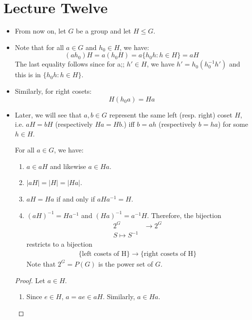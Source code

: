 \section{Lecture Twelve}
\begin{itemize}
    \item From now on, let $G$ be a group and let $H \le G$.
    \item Note that for all $a\in G$ and $h_0 \in H$, we have:
    \begin{equation}
        (ah_0)H=a(h_0H)=a\{h_0h:h \in H\} = aH
    \end{equation}
    The last equality follows since for a;; $h' \in H$, we have $h'=h_0(h_0^{-1}h')$ and this is in $\{h_0h:h\in H\}$.
    \item Similarly, for right cosets:
    \begin{equation}
        H(h_0a)=Ha
    \end{equation}
    \item Later, we will see that $a,b\in G$ represent the same left (resp. right) coset $H$, i.e. $aH=bH$ (respectively $Ha=Hb$.) iff $b=ah$ (respectively $b=ha$) for some $h\in H$.
    \begin{proposition}
        For all $a\in G$, we have:
        \begin{enumerate}
            \item $a\in aH$ and likewise $a\in Ha$.
            \item $|aH|=|H|=|Ha|$.
            \item $aH=Ha$ if and only if $aHa^{-1}=H$.
            \item $(aH)^{-1}=Ha^{-1}$ and $(Ha)^{-1}=a^{-1}H$. Therefore, the bijection
            \begin{align}
                2^G &\rightarrow 2^G \\ 
                S \mapsto S^{-1}
            \end{align}
            restricts to a bijection
            \begin{align}
                \{\text{left cosets of H}\}\rightarrow \{\text{right cosets of H}\}
            \end{align}
            Note that $2^G = P(G)$ is the power set of $G$.
        \end{enumerate}
    \end{proposition}
    \begin{proof}
        Let $a\in H$.
        \begin{enumerate}
            \item Since $e\in H$, $a=ae \in aH$. Similarly, $a\in Ha$.

\end{enumerate}
\end{proof}
\end{itemize}
